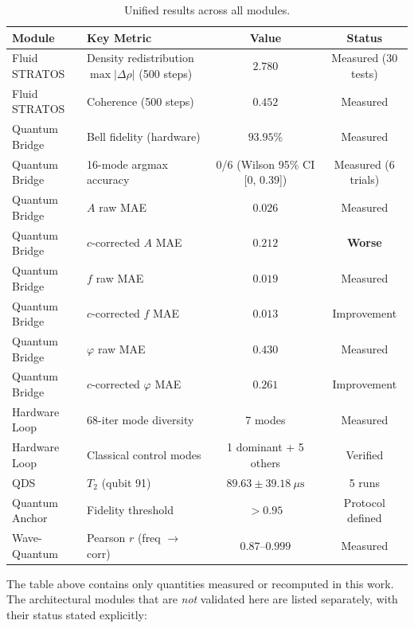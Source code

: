 \documentclass[sigconf,anonymous=false]{acmart}
\begin{document}
\begin{table}[h]
\centering
\caption{Unified results across all modules.}
\label{tab:unified}
\begin{tabular}{llcc}
\toprule
Module & Key Metric & Value & Status \\
\midrule
Fluid STRATOS & Density redistribution $\max|\Delta\rho|$ (500 steps) & $2.780$ & Measured (30 tests) \\
Fluid STRATOS & Coherence (500 steps) & $0.452$ & Measured \\
Quantum Bridge & Bell fidelity (hardware) & $93.95\%$ & Measured \\
Quantum Bridge & 16-mode argmax accuracy & 0/6 (Wilson 95\% CI [0, 0.39]) & Measured (6 trials) \\
Quantum Bridge & $A$ raw MAE & $0.026$ & Measured \\
Quantum Bridge & $c$-corrected $A$ MAE & $0.212$ & \textbf{Worse} \\
Quantum Bridge & $f$ raw MAE & $0.019$ & Measured \\
Quantum Bridge & $c$-corrected $f$ MAE & $0.013$ & Improvement \\
Quantum Bridge & $\varphi$ raw MAE & $0.430$ & Measured \\
Quantum Bridge & $c$-corrected $\varphi$ MAE & $0.261$ & Improvement \\
Hardware Loop & 68-iter mode diversity & 7 modes & Measured \\
Hardware Loop & Classical control modes & 1 dominant + 5 others & Verified \\
QDS & $T_2$ (qubit 91) & $89.63 \pm 39.18\ \mu\text{s}$ & 5 runs \\
Quantum Anchor & Fidelity threshold & $> 0.95$ & Protocol defined \\
Wave-Quantum & Pearson $r$ (freq $\to$ corr) & $0.87$--$0.999$ & Measured \\
\bottomrule
\end{tabular}
\end{table}

The table above contains only quantities measured or recomputed in this work. The architectural
modules that are \emph{not} validated here are listed separately, with their status stated
explicitly:
\end{document}
